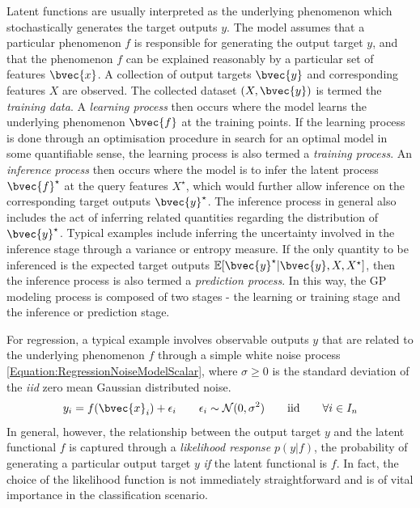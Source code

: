 				Latent functions are usually interpreted as the underlying phenomenon which stochastically generates the target outputs $y$.  The model assumes that a particular phenomenon $f$ is responsible for generating the output target $y$, and that the phenomenon $f$ can be explained reasonably by a particular set of features $\bvec{x}$. A collection of output targets $\bvec{y}$ and corresponding features $X$ are observed. The collected dataset $(X, \bvec{y})$ is termed the \textit{training data}. A \textit{learning process} then occurs where the model learns the underlying phenomenon $\bvec{f}$ at the training points. If the learning process is done through an optimisation procedure in search for an optimal model in some quantifiable sense, the learning process is also termed a \textit{training process}. An \textit{inference process} then occurs where the model is to infer the latent process $\bvec{f}^{\star}$ at the query features $X^{\star}$, which would further allow inference on the corresponding target outputs $\bvec{y}^{\star}$. The inference process in general also includes the act of inferring related quantities regarding the distribution of $\bvec{y}^{\star}$. Typical examples include inferring the uncertainty involved in the inference stage through a variance or entropy measure. If the only quantity to be inferenced is the expected target outputs $\mathbb{E}[\bvec{y}^{\star} | \bvec{y}, X, X^{\star}]$, then the inference process is also termed a \textit{prediction process}. In this way, the GP modeling process is composed of two stages - the learning or training stage and the inference or prediction stage.
				
				For regression, a typical example involves observable outputs $y$ that are related to the underlying phenomenon $f$ through a simple white noise process \eqref{Equation:RegressionNoiseModelScalar}, where $\sigma \geq 0$ is the standard deviation of the \textit{iid} zero mean Gaussian distributed noise. \begin{equation}
					y_{i} = f(\bvec{x}_{i}) + \epsilon_{i} \qquad \epsilon_{i} \sim \mathcal{N}(0, \sigma^{2}) \qquad \mathrm{iid} \qquad \forall i \in I_{n}
				\label{Equation:RegressionNoiseModelScalar}
				\end{equation} In general, however, the relationship between the output target $y$ and the latent functional $f$ is captured through a \textit{likelihood response} $p(y | f)$, the probability of generating a particular output target $y$ \textit{if} the latent functional is $f$. In fact, the choice of the likelihood function is not immediately straightforward and is of vital importance in the classification scenario. 
				
